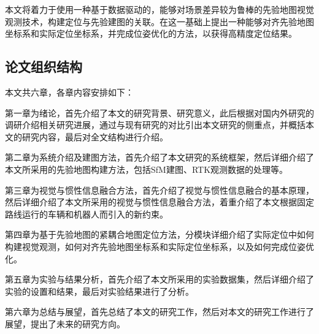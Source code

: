 本文将着力于使用一种基于数据驱动的，能够对场景差异较为鲁棒的先验地图视觉观测技术，构建定位与先验建图的关联。在这一基础上提出一种能够对齐先验地图坐标系和实际定位坐标系，并完成位姿优化的方法，以获得高精度定位结果。

\subsection{论文组织结构}
本文共六章，各章内容安排如下：

第一章为绪论，首先介绍了本文的研究背景、研究意义，此后根据对国内外研究的调研介绍相关研究进展，通过与现有研究的对比引出本文研究的侧重点，并概括本文的研究内容，最后对全文结构进行介绍。

第二章为系统介绍及建图方法，首先介绍了本文研究的系统框架，然后详细介绍了本文所采用的先验地图构建方法，包括SfM建图、RTK观测数据的处理等。

第三章为视觉与惯性信息融合方法，首先介绍了视觉与惯性信息融合的基本原理，然后详细介绍了本文所采用的视觉与惯性信息融合方法，着重介绍了本文根据固定路线运行的车辆和机器人而引入的新约束。

第四章为基于先验地图的紧耦合地图定位方法，分模块详细介绍了实际定位中如何构建视觉观测，如何对齐先验地图坐标系和实际定位坐标系，以及如何完成位姿优化。

第五章为实验与结果分析，首先介绍了本文所采用的实验数据集，然后详细介绍了实验的设置和结果，最后对实验结果进行了分析。

第六章为总结与展望，首先总结了本文的研究工作，然后对本文的研究工作进行了展望，提出了未来的研究方向。